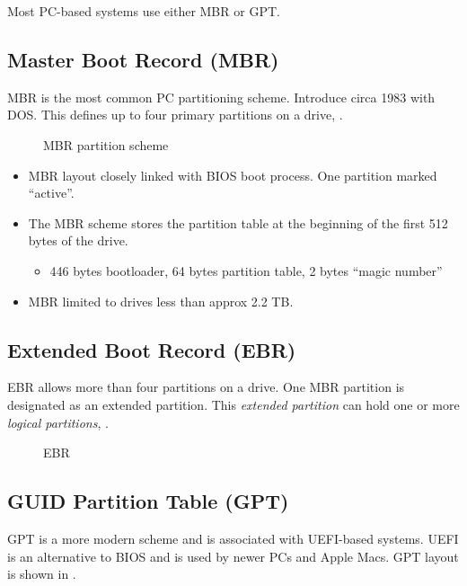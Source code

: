 Most PC-based systems use either MBR or GPT.

\subsection{Master Boot Record (MBR)}\label{master-boot-record-mbr}

MBR is the most common PC partitioning scheme. Introduce circa 1983 with
DOS. This defines up to four primary partitions on a drive, .

\begin{figure}
\centering
\caption{MBR partition scheme}
\end{figure}

\begin{itemize}
\item
  MBR layout closely linked with BIOS boot process. One partition marked
  ``active''.
\item
  The MBR scheme stores the partition table at the beginning of the
  first 512 bytes of the drive.

  \begin{itemize}
  
  \item
    446 bytes bootloader, 64 bytes partition table, 2 bytes ``magic
    number''
  \end{itemize}
\item
  MBR limited to drives less than approx 2.2 TB.
\end{itemize}

\subsection{Extended Boot Record (EBR)}\label{extended-boot-record-ebr}

EBR allows more than four partitions on a drive. One MBR partition is
designated as an extended partition. This \emph{extended partition} can
hold one or more \emph{logical partitions}, .

\begin{figure}
\centering
\caption{EBR}
\end{figure}

\subsection{GUID Partition Table (GPT)}\label{guid-partition-table-gpt}

GPT is a more modern scheme and is associated with UEFI-based systems.
UEFI is an alternative to BIOS and is used by newer PCs and Apple Macs.
GPT layout is shown in .


